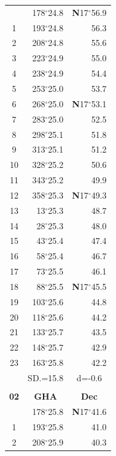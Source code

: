 \documentclass[10pt, a4paper]{report}
\begin{document}
\begin{scriptsize}
\begin{tabular*}{0.2\textwidth}[t]{@{\extracolsep{\fill}}|c|rr|}
\hline\rule{0pt}{2.6ex}\noindent
0 & 178$^\circ$24.8 & \textbf{N}17$^\circ$56.9\\
1 & 193$^\circ$24.8 & 56.3\\
2 & 208$^\circ$24.8 & 55.6\\
3 & 223$^\circ$24.9 & \raisebox{0.24ex}{\boldmath$\cdot$~\boldmath$\cdot$~~}55.0\\
4 & 238$^\circ$24.9 & 54.4\\
5 & 253$^\circ$25.0 & 53.7\\[2Pt]
6 & 268$^\circ$25.0 & \textbf{N}17$^\circ$53.1\\
7 & 283$^\circ$25.0 & 52.5\\
8 & 298$^\circ$25.1 & 51.8\\
9 & 313$^\circ$25.1 & \raisebox{0.24ex}{\boldmath$\cdot$~\boldmath$\cdot$~~}51.2\\
10 & 328$^\circ$25.2 & 50.6\\
11 & 343$^\circ$25.2 & 49.9\\[2Pt]
12 & 358$^\circ$25.3 & \textbf{N}17$^\circ$49.3\\
13 & 13$^\circ$25.3 & 48.7\\
14 & 28$^\circ$25.3 & 48.0\\
15 & 43$^\circ$25.4 & \raisebox{0.24ex}{\boldmath$\cdot$~\boldmath$\cdot$~~}47.4\\
16 & 58$^\circ$25.4 & 46.7\\
17 & 73$^\circ$25.5 & 46.1\\[2Pt]
18 & 88$^\circ$25.5 & \textbf{N}17$^\circ$45.5\\
19 & 103$^\circ$25.6 & 44.8\\
20 & 118$^\circ$25.6 & 44.2\\
21 & 133$^\circ$25.7 & \raisebox{0.24ex}{\boldmath$\cdot$~\boldmath$\cdot$~~}43.5\\
22 & 148$^\circ$25.7 & 42.9\\
23 & 163$^\circ$25.8 & 42.2\\
\hline
\rule{0pt}{2.4ex} & \multicolumn{1}{c}{SD.=15.8} & \multicolumn{1}{c|}{d=-0.6}\\
\hline
\multicolumn{1}{c}{}\\[-0.5ex]\hline
\multicolumn{1}{|c|}{\rule{0pt}{2.6ex}\textbf{02}} & \multicolumn{1}{c}{\textbf{GHA}} & \multicolumn{1}{c|}{\textbf{Dec}}\\
\hline\rule{0pt}{2.6ex}\noindent
0 & 178$^\circ$25.8 & \textbf{N}17$^\circ$41.6\\
1 & 193$^\circ$25.8 & 41.0\\
2 & 208$^\circ$25.9 & 40.3\\

\end{tabular*}
\end{scriptsize}
\end{document}
